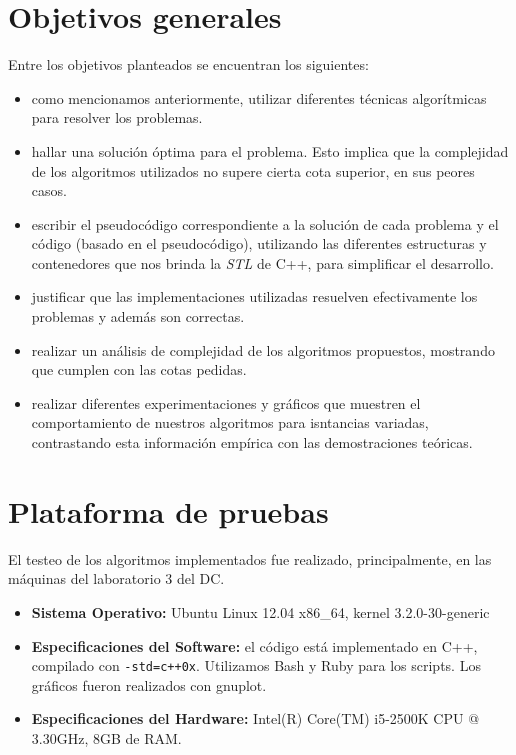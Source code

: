 \documentclass[a4paper]{article}
\begin{document}
\section{Objetivos generales}
Entre los objetivos planteados se encuentran los siguientes:
\begin{itemize}
  \item como mencionamos anteriormente, utilizar diferentes técnicas algorítmicas para
  resolver los problemas.
  
  \item hallar una solución óptima para el problema. Esto implica que la complejidad de los 
  algoritmos utilizados no supere cierta cota superior, en sus peores casos.  
  
  \item escribir el pseudocódigo correspondiente a la solución de cada problema y el código
  (basado en el pseudocódigo), utilizando las diferentes estructuras y contenedores que nos 
  brinda la \textit{STL} de C++, para simplificar el desarrollo.
  
  \item justificar que las implementaciones utilizadas resuelven efectivamente los problemas y
  además son correctas.
  
  \item realizar un análisis de complejidad de los algoritmos propuestos, mostrando que cumplen
  con las cotas pedidas.
  
  \item realizar diferentes experimentaciones y gráficos que muestren el comportamiento de nuestros
  algoritmos para isntancias variadas, contrastando esta información empírica con las demostraciones
  teóricas.
\end{itemize}

\newpage

\section{Plataforma de pruebas}
El testeo de los algoritmos implementados fue realizado, principalmente, en las máquinas del laboratorio 3 del DC. \newline
\begin{itemize}
  \item \textbf{Sistema Operativo:} Ubuntu Linux 12.04 x86_64, kernel 3.2.0-30-generic
  
  \item \textbf{Especificaciones del Software:} el código está implementado en C++, compilado con \verb|-std=c++0x|. 
  Utilizamos Bash y Ruby para los scripts. Los gráficos fueron realizados con gnuplot.
  
  \item \textbf{Especificaciones del Hardware:} Intel(R) Core(TM) i5-2500K CPU @ 3.30GHz, 8GB de RAM.
\end{itemize}
\end{document}
